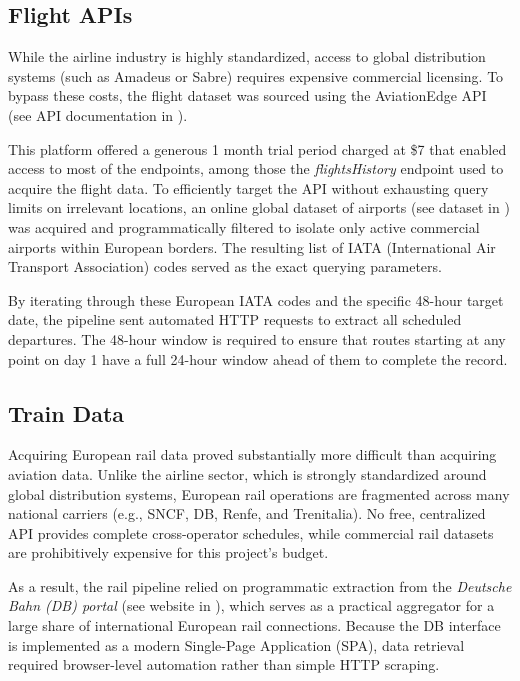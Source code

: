 \subsection{Flight APIs}
\label{subsec:flight_apis}
While the airline industry is highly standardized, access to global distribution systems (such as Amadeus or Sabre) requires expensive commercial licensing. To bypass these costs, the flight dataset was sourced using the AviationEdge API (see API documentation in \cite{aviationedge}).

\medskip

This platform offered a generous 1 month trial period charged at \$7 that enabled access to most of the endpoints, among those the \textit{flightsHistory} endpoint used to acquire the flight data. To efficiently target the API without exhausting query limits on irrelevant locations, an online global dataset of airports (see dataset in \cite{ourairports}) was acquired and programmatically filtered to isolate only active commercial airports within European borders. The resulting list of IATA (International Air Transport Association) codes served as the exact querying parameters.

\medskip

By iterating through these European IATA codes and the specific 48-hour target date, the pipeline sent automated HTTP requests to extract all scheduled departures. The 48-hour window is required to ensure that routes starting at any point on day 1 have a full 24-hour window ahead of them to complete the record.

\subsection{Train Data}
\label{subsec:train_data}
Acquiring European rail data proved substantially more difficult than acquiring aviation data. Unlike the airline sector, which is strongly standardized around global distribution systems, European rail operations are fragmented across many national carriers (e.g., SNCF, DB, Renfe, and Trenitalia). No free, centralized API provides complete cross-operator schedules, while commercial rail datasets are prohibitively expensive for this project's budget.

\medskip

As a result, the rail pipeline relied on programmatic extraction from the \textit{Deutsche Bahn (DB) portal} (see website in \cite{deutschebahn}), which serves as a practical aggregator for a large share of international European rail connections. Because the DB interface is implemented as a modern Single-Page Application (SPA), data retrieval required browser-level automation rather than simple HTTP scraping.

